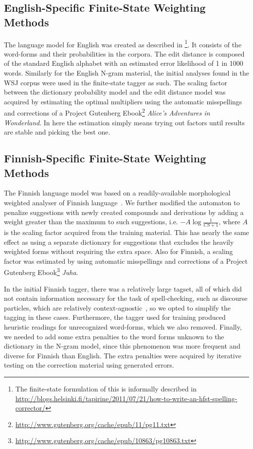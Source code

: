 \documentclass[postprint]{flammie}
\begin{document}
\subsection{English-Specific Finite-State Weighting Methods}

The language model for English was created as described in
\cite{norvig/2010}\footnote{The finite-state formulation of this is informally
described in
\url{http://blogs.helsinki.fi/tapirine/2011/07/21/how-to-write-an-hfst-spelling-corrector/}}.
It consists of the word-forms and their  probabilities in the corpora. The edit
distance is composed of the standard English alphabet with an estimated error
likelihood of 1 in 1000 words.  Similarly for the English N-gram material, the
initial analyses found in the WSJ corpus were used in the finite-state tagger
as such. The scaling factor between the dictionary probability model and the
edit distance model was acquired by estimating the optimal multipliers using
the automatic misspellings and corrections of a Project Gutenberg
Ebook\footnote{\url{http://www.gutenberg.org/cache/epub/11/pg11.txt}}
\emph{Alice's Adventures in Wonderland}. In here the estimation simply means
trying out factors until results are stable and picking the best one.

\subsection{Finnish-Specific Finite-State Weighting Methods}

The Finnish language model was based on a readily-available morphological
weighted analyser of Finnish language~\cite{pirinen/2011/nodalida}.  We further
modified the automaton to penalize suggestions with newly created compounds and
derivations by adding a weight greater than the maximum to such suggestions,
i.e. $-A\log\frac{1}{CS+1}$, where $A$ is the scaling factor acquired from the
training material. This has nearly the same effect as using a separate
dictionary for suggestions that excludes the heavily weighted forms without
requiring the extra space.  Also for Finnish, a scaling factor was estimated by
using automatic misspellings and corrections of a Project Gutenberg
Ebook\footnote{\url{http://www.gutenberg.org/cache/epub/10863/pg10863.txt}}
\emph{Juha}.

In the initial Finnish tagger, there was a relatively large tagset, all of
which did not contain information necessary for the task of
spell-checking, such as discourse particles, which are relatively
context-agnostic~\cite{visk}, so we opted to simplify the tagging in these
cases. Furthermore, the tagger used for training produced heuristic readings for
unrecognized word-forms, which we also removed. Finally, we needed to add
some extra penalties to the word forms unknown to the dictionary in the 
N-gram model, since this phenomenon was more frequent and diverse for Finnish
than English. The extra penalties were acquired by iterative testing on the
correction material using generated errors.
\end{document}
